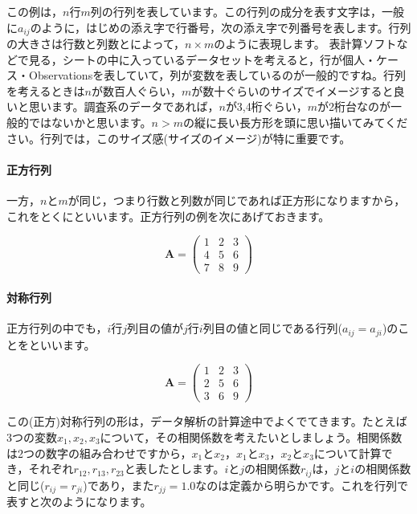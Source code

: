 \documentclass{ltjsbook}
\begin{document}
この例は，$n$行$m$列の行列を表しています。この行列の成分を表す文字は，一般に$a_{ij}$のように，はじめの添え字で行番号，次の添え字で列番号を表します。行列の大きさは行数と列数とによって，$n \times m$のように表現します。
表計算ソフトなどで見る，シートの中に入っているデータセットを考えると，行が個人・ケース・Observationsを表していて，列が変数を表しているのが一般的ですね。行列を考えるときは$n$が数百人ぐらい，$m$が数十ぐらいのサイズでイメージすると良いと思います。調査系のデータであれば，$n$が3,4桁ぐらい，$m$が2桁台なのが一般的ではないかと思います。$n>m$の縦に長い長方形を頭に思い描いてみてください。行列では，このサイズ感(サイズのイメージ)が特に重要です。

\paragraph{正方行列}
一方，$n$と$m$が同じ，つまり行数と列数が同じであれば正方形になりますから，これをとくにといいます。正方行列の例を次にあげておきます。


\begin{equation*}
	\bm{A} =
	\begin{pmatrix}
		1 & 2 & 3 \\
		4 & 5 & 6 \\
		7 & 8 & 9
	\end{pmatrix}
\end{equation*}

\paragraph{対称行列}

正方行列の中でも，$i$行$j$列目の値が$j$行$i$列目の値と同じである行列($a_{ij}=a_{ji}$)のことをといいます。

\begin{equation*}
	\bm{A} =
	\begin{pmatrix}
		1 & 2 & 3 \\
		2 & 5 & 6 \\
		3 & 6 & 9
	\end{pmatrix}
\end{equation*}

この(正方)対称行列の形は，データ解析の計算途中でよくでてきます。たとえば3つの変数$x_1,x_2,x_3$について，その相関係数を考えたいとしましょう。相関係数は2つの数字の組み合わせですから，$x_1$と$x_2$，$x_1$と$x_3$，$x_2$と$x_3$について計算でき，それぞれ$r_{12},r_{13},r_{23}$と表したとします。$i$と$j$の相関係数$r_{ij}$は，$j$と$i$の相関係数と同じ($r_{ij}=r_{ji}$)であり，また$r_{jj}=1.0$なのは定義から明らかです。これを行列で表すと次のようになります。
\end{document}
